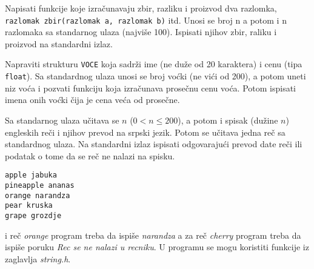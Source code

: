  
\begin{Exercise}[label=p2.5_] 
Napisati funkcije koje izra\v cunavaju zbir, razliku i proizvod dva
razlomka, \verb|razlomak zbir(razlomak a, razlomak b)| itd. Unosi se
broj n a potom i n razlomaka sa standarnog ulaza (najvi\v se
100). Ispisati njihov zbir, raliku i proizvod na standardni izlaz.
\end{Exercise}
\begin{Answer}[ref=p2.5_]
\end{Answer}


\begin{Exercise}[label=p2.5_] 
Napraviti strukturu \verb|VOCE|
koja sadr\v zi ime (ne du\v ze od 20 karaktera)
i cenu (tipa \verb|float|). Sa standardnog ulaza unosi se broj vo\' cki (ne vi\' ci od 200), a
potom uneti niz vo\' ca i pozvati funkciju koja izra\v cunava prose\v cnu cenu vo\'ca.
Potom ispisati imena onih vo\'cki \v cija je cena ve\' ca od prose\v cne.
\end{Exercise}
\begin{Answer}[ref=p2.5_]
\end{Answer}


\begin{Exercise}[label=p2.5_] 
Sa standarnog ulaza u\v citava se $n$ ($0 < n \le 200$), a potom i 
spisak (du\v zine $n$) engleskih re\v{c}i i njihov prevod
na srpski jezik. Potom se u\v citava jedna re\v c sa standardnog ulaza. Na standardni izlaz ispisati
odgovaraju\' ci prevod date re\v ci ili podatak o tome da se re\v c ne 
nalazi na spisku.

\begin{verbatim}
apple jabuka
pineapple ananas
orange narandza
pear kruska
grape grozdje
\end{verbatim}

\noindent
i re\v c \emph{orange} program treba da ispi\v se \emph{narandza} a za re\v c
\emph{cherry} program treba da ispi\v se poruku \emph{Rec se ne nalazi u recniku}.
U programu se mogu koristiti funkcije iz zaglavlja \emph{string.h}.
\end{Exercise}
\begin{Answer}[ref=p2.5_]
\end{Answer}


